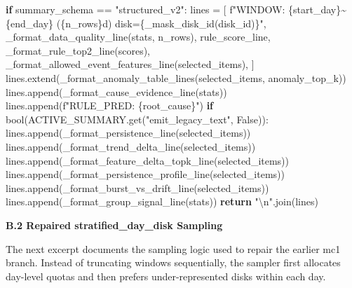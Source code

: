\documentclass[
  11pt,
  a4paper]{article}
\newenvironment{Shaded}{}{}
\newcommand{\BuiltInTok}[1]{#1}
\newcommand{\CharTok}[1]{\textcolor[rgb]{0.25,0.44,0.63}{#1}}
\newcommand{\ControlFlowTok}[1]{\textcolor[rgb]{0.00,0.44,0.13}{\textbf{#1}}}
\newcommand{\NormalTok}[1]{#1}
\newcommand{\OperatorTok}[1]{\textcolor[rgb]{0.40,0.40,0.40}{#1}}
\newcommand{\SpecialCharTok}[1]{\textcolor[rgb]{0.25,0.44,0.63}{#1}}
\newcommand{\SpecialStringTok}[1]{\textcolor[rgb]{0.73,0.40,0.53}{#1}}
\newcommand{\StringTok}[1]{\textcolor[rgb]{0.25,0.44,0.63}{#1}}
\newcommand{\VariableTok}[1]{\textcolor[rgb]{0.10,0.09,0.49}{#1}}
\begin{document}
\begin{Shaded}
\begin{Highlighting}[]
\ControlFlowTok{if}\NormalTok{ summary\_schema }\OperatorTok{==} \StringTok{"structured\_v2"}\NormalTok{:}
\NormalTok{    lines }\OperatorTok{=}\NormalTok{ [}
        \SpecialStringTok{f"WINDOW: }\SpecialCharTok{\{}\NormalTok{start\_day}\SpecialCharTok{\}}\SpecialStringTok{\textasciitilde{}}\SpecialCharTok{\{}\NormalTok{end\_day}\SpecialCharTok{\}}\SpecialStringTok{ (}\SpecialCharTok{\{}\NormalTok{n\_rows}\SpecialCharTok{\}}\SpecialStringTok{d) disk=}\SpecialCharTok{\{}\NormalTok{\_mask\_disk\_id(disk\_id)}\SpecialCharTok{\}}\SpecialStringTok{"}\NormalTok{,}
\NormalTok{        \_format\_data\_quality\_line(stats, n\_rows),}
\NormalTok{        rule\_score\_line,}
\NormalTok{        \_format\_rule\_top2\_line(scores),}
\NormalTok{        \_format\_allowed\_event\_features\_line(selected\_items),}
\NormalTok{    ]}
\NormalTok{    lines.extend(\_format\_anomaly\_table\_lines(selected\_items, anomaly\_top\_k))}
\NormalTok{    lines.append(\_format\_cause\_evidence\_line(stats))}
\NormalTok{    lines.append(}\SpecialStringTok{f"RULE\_PRED: }\SpecialCharTok{\{}\NormalTok{root\_cause}\SpecialCharTok{\}}\SpecialStringTok{"}\NormalTok{)}
    \ControlFlowTok{if} \BuiltInTok{bool}\NormalTok{(ACTIVE\_SUMMARY.get(}\StringTok{"emit\_legacy\_text"}\NormalTok{, }\VariableTok{False}\NormalTok{)):}
\NormalTok{        lines.append(\_format\_persistence\_line(selected\_items))}
\NormalTok{        lines.append(\_format\_trend\_delta\_line(selected\_items))}
\NormalTok{        lines.append(\_format\_feature\_delta\_topk\_line(selected\_items))}
\NormalTok{        lines.append(\_format\_persistence\_profile\_line(selected\_items))}
\NormalTok{        lines.append(\_format\_burst\_vs\_drift\_line(selected\_items))}
\NormalTok{        lines.append(\_format\_group\_signal\_line(stats))}
    \ControlFlowTok{return} \StringTok{"}\CharTok{\textbackslash{}n}\StringTok{"}\NormalTok{.join(lines)}
\end{Highlighting}
\end{Shaded}

\textbf{B.2 Repaired stratified\_day\_disk Sampling}

The next excerpt documents the sampling logic used to repair the earlier
mc1 branch. Instead of truncating windows sequentially, the sampler
first allocates day-level quotas and then prefers under-represented
disks within each day.
\end{document}
